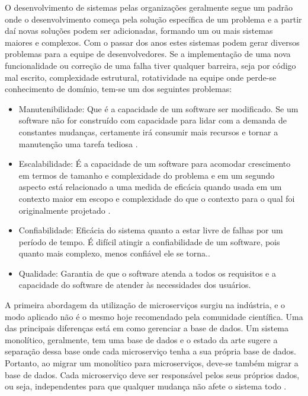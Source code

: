 \documentclass[12pt]{article}
\begin{document}
O desenvolvimento de sistemas pelas organizações geralmente segue um padrão onde o desenvolvimento começa pela solução específica de um problema e a partir daí novas soluções podem ser adicionadas, formando um ou mais sistemas maiores e complexos. Com o passar dos anos estes sistemas podem gerar diversos problemas para a equipe de desenvolvedores. Se a implementação de uma nova funcionalidade ou correção de uma falha tiver qualquer barreira, seja por código mal escrito, complexidade estrutural, rotatividade na equipe onde perde-se conhecimento de domínio, tem-se um dos seguintes problemas:
\begin{itemize}
	\item Manutenibilidade: Que é a capacidade de um software ser modificado. Se um software não for construído com capacidade para lidar com a demanda de constantes mudanças, certamente irá consumir mais recursos e tornar a manutenção uma tarefa tediosa \cite{Velmourougan2014}.
	\item Escalabilidade: É a capacidade de um software para acomodar crescimento em termos de tamanho e complexidade do problema e em um segundo aspecto está relacionado a uma medida de eficácia quando usada em um contexto maior em escopo e complexidade do que o contexto para o qual foi originalmente projetado \cite{Ibrahim2009}.
	\item Confiabilidade: Eficácia do sistema quanto a estar livre de falhas por um período de tempo. É difícil atingir a confiabilidade de um software, pois quanto mais complexo, menos confiável ele se torna.\cite{pan1999}.
	\item Qualidade: Garantia de que o software atenda a todos os requisitos e a capacidade do software de atender às necessidades dos usuários.
\end{itemize}


A primeira abordagem da utilização de microserviços surgiu na indústria, e o modo aplicado não é o mesmo hoje recomendado pela comunidade científica. Uma das principais diferenças está em como gerenciar a base de dados. Um sistema monolítico, geralmente, tem uma base de dados e o estado da arte sugere a separação dessa base onde cada microserviço tenha a sua própria base de dados. Portanto, ao migrar um monolítico para microserviços, deve-se também migrar a base de dados. Cada microserviço deve ser responsável pelos seus próprios dados, ou seja, independentes para que qualquer mudança não afete o sistema todo \cite{Kholy2019}. 
\end{document}
